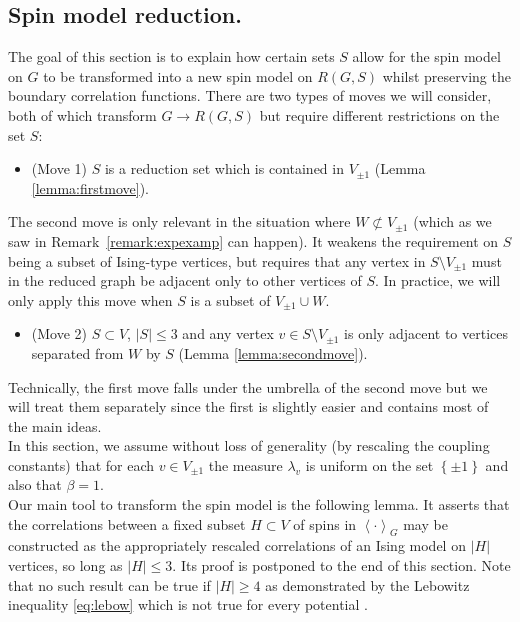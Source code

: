 \documentclass{article}
\numberwithin{equation}{section}
\theoremstyle{definition}
\theoremstyle{definition}
\theoremstyle{remark}
\renewcommand{\l}{\lambda}
\newcommand{\Vis}{V_{\mathrm{Ising}}}
\renewcommand{\Vis}{V_{\pm 1}}
\begin{document}
\subsection{Spin model reduction. }
The goal of this section is to explain how certain sets $S$ allow for the spin model on $G$ to be transformed into a new spin model on $R(G,S)$ whilst preserving the boundary correlation functions. There are two types of moves we will consider, both of which transform $G \to R(G,S)$ but require different restrictions on the set $S$:
\begin{itemize}
	\item (Move 1) $S$ is a reduction set which is contained in $\Vis$ (Lemma \ref{lemma:firstmove}).
\end{itemize}
The second move is only relevant in the situation where $W \not\subset \Vis$ (which as we saw in Remark~\ref{remark:expexamp} can happen). It weakens the requirement on $S$ being a subset of Ising-type vertices, but requires that any vertex in $S \setminus \Vis$ must in the reduced graph be adjacent only to other vertices of $S$. In practice, we will only apply this move when $S$ is a subset of $\Vis \cup W$. 
\begin{itemize}
	\item (Move 2)   $S \subset V$, $|S| \leq 3$ and any vertex $v \in S \setminus \Vis$ is only adjacent to vertices separated from $W$ by $S$ (Lemma \ref{lemma:secondmove}).
\end{itemize}
Technically, the first move falls under the umbrella of the second move but we will treat them separately since the first is slightly easier and contains most of the main ideas.
\\[1em]
In this section, we assume without loss of generality (by rescaling the coupling constants) that for each $v \in \Vis$ the measure $\l_v$ is uniform on the set $\left\{ \pm 1 \right\}$ and also that $\beta = 1$. 
\\[1em]
\noindent Our main tool to transform the spin model is the following lemma. It asserts that the correlations between a fixed subset $H \subset V$ of spins in $\left< \cdot \right>_{G}$ may be constructed as the appropriately rescaled correlations of an Ising model on $|H|$ vertices, {so long as $|H| \leq 3$}. Its proof is postponed to the end of this section. Note that no such result can be true if $|H| \geq 4$ as demonstrated by the Lebowitz inequality \eqref{eq:lebow} which is not true for every potential \cite{simon1973varphi4}.  
\end{document}
